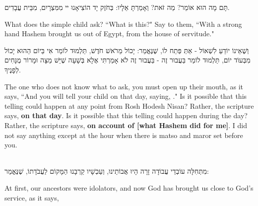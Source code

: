 תָּם מָה הוּא אוֹמֵר? מַה זֹּאת? וְאָמַרְתָּ אֵלָיו: בְּחֹזֶק יָד הוֹצִיאָנוּ יי מִמִּצְרָיִם, מִבֵּית עֲבָדִים.

\begin{english}
What does the simple child ask? ``What is this?" Say to them, ``With a strong hand Hashem brought us out of Egypt, from the house of servitude."
\end{english}

וְשֶׁאֵינוֹ יוֹדֵעַ לִשְׁאוֹל - אַתְּ פְּתַח לוֹ, שֶׁנֶּאֱמַר: יָכוֹל מֵרֹאשׁ חֹדֶשׁ, תַּלְמוּד לוֹמַר  אִי בַּיוֹם הַהוּא יָכוֹל מִבְּעוֹד יוֹם, תַּלְמוּד לוֹמַר בַּעֲבוּר זֶה - בַּעֲבוּר זֶה לֹא אָמַרְתִּי אֶלָא בְּשָׁעָה שֶׁיֵּשׁ מַצָּה וּמָרוֹר מֻנָּחִים לְפָנֶיךָ.

\begin{english}
The one who does not know what to ask, you must open up their mouth, as it says, ``And you will tell your child on that day, saying, ." Is it possible that this telling could happen at any point from Rosh Hodesh Nisan? Rather, the scripture says, {\bfseries on that day}. Is it possible that this telling could happen during the day? Rather, the scripture says, {\bfseries on account of [what Hashem did for me]}. I did not say anything except at the hour when there is matso and maror set before you.
\end{english}

\ \\

מִתְּחִלָּה עוֹבְדֵי עֲבוֹדָה זָרָה הָיוּ אֲבוֹתֵינוּ, וְעַכְשָׁיו קֵרְבָנוּ הַמָּקוֹם לַעֲבֹדָתוֹ, 
שֶׁנֶּאֱמַר:

\begin{english}
At first, our ancestors were idolators, and now God has brought us close to God's service, as it says, 
\end{english}

